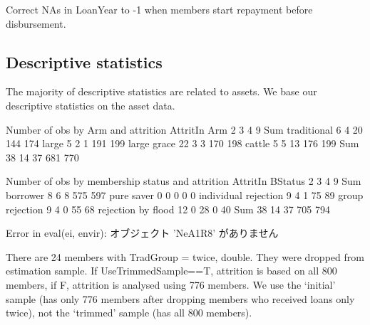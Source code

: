 Correct NAs in \textsf{LoanYear} to -1 when members start repayment before disbursement.




\subsection{Descriptive statistics}




The majority of descriptive statistics are related to assets. We base our descriptive statistics on the asset data.

\begin{Schunk}
\begin{Soutput}


Number of obs by Arm and attrition
             AttritIn
Arm             2   3   4   9 Sum
  traditional   6   4  20 144 174
  large         5   2   1 191 199
  large grace  22   3   3 170 198
  cattle        5   5  13 176 199
  Sum          38  14  37 681 770


Number of obs by membership status and attrition
                      AttritIn
BStatus                  2   3   4   9 Sum
  borrower               8   6   8 575 597
  pure saver             0   0   0   0   0
  individual rejection   9   4   1  75  89
  group rejection        9   4   0  55  68
  rejection by flood    12   0  28   0  40
  Sum                   38  14  37 705 794
\end{Soutput}
\begin{Soutput}
Error in eval(ei, envir):  オブジェクト 'NeA1R8' がありません 
\end{Soutput}
\end{Schunk}

There are 24 members with TradGroup = twice, double. They were dropped from estimation sample. If \textsf{UseTrimmedSample==T}, attrition is based on all 800 members, if \textsf{F}, attrition is analysed using 776 members. We use the `initial' sample (has only 776 members after dropping members who received loans only twice), not the `trimmed' sample (has all 800 members). \gobblepars

